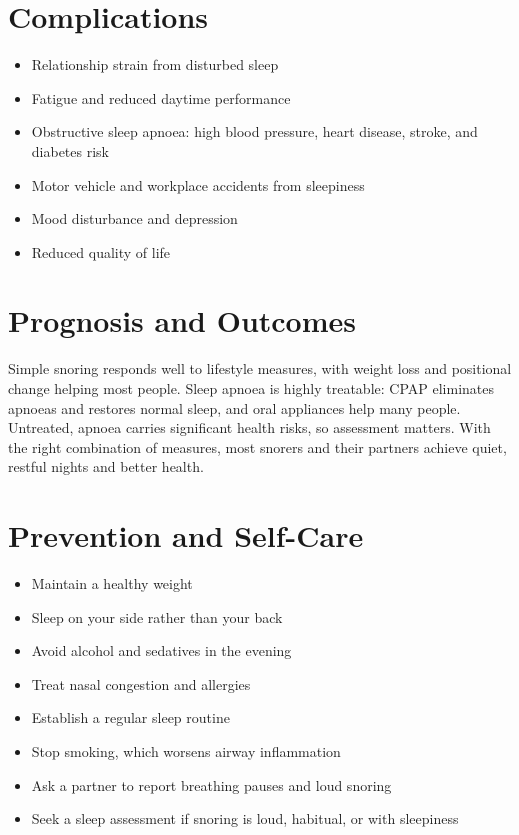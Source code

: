 \section*{Complications}
\begin{itemize}
    \item Relationship strain from disturbed sleep
    \item Fatigue and reduced daytime performance
    \item Obstructive sleep apnoea: high blood pressure, heart disease, stroke, and diabetes risk
    \item Motor vehicle and workplace accidents from sleepiness
    \item Mood disturbance and depression
    \item Reduced quality of life
\end{itemize}

\section*{Prognosis and Outcomes}
Simple snoring responds well to lifestyle measures, with weight loss and positional change helping most people. Sleep apnoea is highly treatable: CPAP eliminates apnoeas and restores normal sleep, and oral appliances help many people. Untreated, apnoea carries significant health risks, so assessment matters. With the right combination of measures, most snorers and their partners achieve quiet, restful nights and better health.

\section*{Prevention and Self-Care}
\begin{itemize}
    \item Maintain a healthy weight
    \item Sleep on your side rather than your back
    \item Avoid alcohol and sedatives in the evening
    \item Treat nasal congestion and allergies
    \item Establish a regular sleep routine
    \item Stop smoking, which worsens airway inflammation
    \item Ask a partner to report breathing pauses and loud snoring
    \item Seek a sleep assessment if snoring is loud, habitual, or with sleepiness
\end{itemize}


